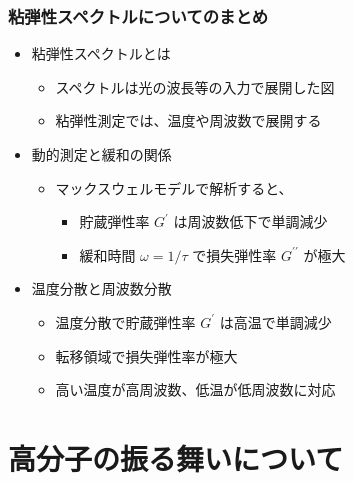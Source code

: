 \documentclass[12pt, dvipdfmx]{beamer}
\begin{document}
\begin{frame}
	\frametitle{粘弾性スペクトルについてのまとめ}
        \begin{boxnote}
            \vspace{-3mm}
            \begin{itemize}
                \item 粘弾性スペクトルとは
                    \begin{itemize}
                        \item スペクトルは光の波長等の入力で展開した図
                        \item 粘弾性測定では、温度や周波数で展開する
                    \end{itemize} 
                \item 動的測定と緩和の関係
                    \begin{itemize}
                        \item マックスウェルモデルで解析すると、
                        \begin{itemize}
							\item 貯蔵弾性率 $G^{\prime}$ は周波数低下で単調減少
							\item 緩和時間 $\omega = 1/\tau$ で損失弾性率 $G^{\prime\prime}$ が極大
						\end{itemize}
                    \end{itemize} 
                \item 温度分散と周波数分散
                    \begin{itemize}
                        \item 温度分散で貯蔵弾性率 $G^{\prime}$ は高温で単調減少
                        \item 転移領域で損失弾性率が極大
                        \item 高い温度が高周波数、低温が低周波数に対応
                    \end{itemize}
            \end{itemize}
        \end{boxnote}
\end{frame}


\section{高分子の振る舞いについて}
\end{document}
